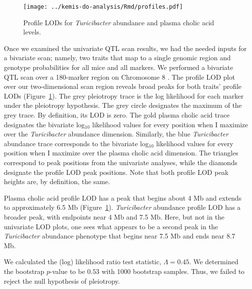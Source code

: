 \documentclass[oneside]{book}\usepackage[]{graphicx}\usepackage[]{color}
\begin{document}

\begin{figure}
\texttt{[image: ../kemis-do-analysis/Rmd/profiles.pdf]}
\caption{Profile LODs for \emph{Turicibacter} abundance and plasma cholic acid levels.}\label{fig:3c-profile}
\end{figure}

Once we examined the univariate QTL scan results, 
we had the needed inputs for a bivariate scan; namely, two traits that map to a single 
genomic region and genotype probabilities for all mice and all markers. 
We performed a bivariate QTL scan over a 180-marker region on Chromosome 8 \citep{qtl2pleio}. 
The profile LOD plot over our two-dimensional scan region reveals broad peaks
for both traits' profile LODs (Figure~\ref{fig:3c-profile}). The grey pleiotropy trace is 
the log likelihood for each marker under the pleiotropy hypothesis. The grey circle 
designates the maximum of the grey trace. By definition, its LOD is zero. The gold plasma 
cholic acid trace designates the bivariate log$_{10}$ likelihood values for every position 
when I maximize over the \emph{Turicibacter} abundance dimension. Similarly, the blue 
\emph{Turicibacter} abundance trace corresponds to the bivariate log$_{10}$ likelihood 
values for every position when I maximize over the plasma cholic acid dimension. The 
triangles correspond to peak positions from the univariate analyses, while the diamonds 
designate the profile LOD peak positions. Note that both profile LOD peak heights are, by 
definition, the same. 

Plasma cholic acid profile LOD has a peak that begins about 4 Mb and extends to 
approximately 6.5 Mb (Figure~\ref{fig:3c-profile}). \emph{Turicibacter} abundance profile LOD has a broader peak, 
with endpoints near 4 Mb and 7.5 Mb. Here, but not in the univariate 
LOD plots, one sees what appears to be a second peak in the \emph{Turicibacter} 
abundance phenotype that begins near 7.5 Mb and ends near 8.7 Mb. 



We calculated the (log) likelihood ratio test statistic, $\Lambda = 0.45$. We 
determined the bootstrap $p$-value to be $0.53$ with 1000 bootstrap 
samples. Thus, we failed to reject the null hypothesis of pleiotropy.
\end{document}
